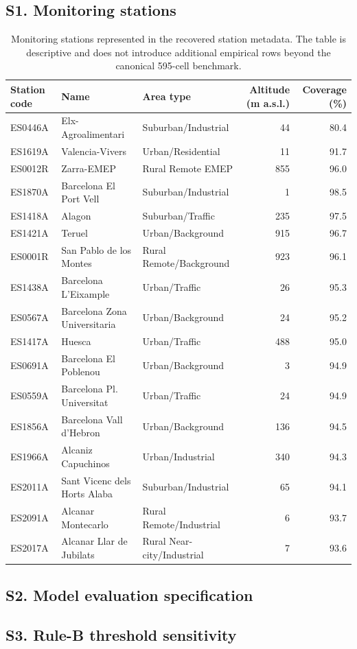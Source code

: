 
\subsection*{S1. Monitoring stations}
\begin{table}[ht]
\centering
\small
\setlength{\tabcolsep}{3pt}
\caption{Monitoring stations represented in the recovered station metadata. The table is descriptive and does not introduce additional empirical rows beyond the canonical 595-cell benchmark.}
\label{tab:stations-supp}
\begin{tabular}{@{}l>{\raggedright\arraybackslash}p{3.8cm}>{\raggedright\arraybackslash}p{3.3cm}rr@{}}
\hline
Station code & Name & Area type & Altitude (m a.s.l.) & Coverage (\%) \\
\hline
ES0446A & Elx-Agroalimentari & Suburban/Industrial & 44 & 80.4 \\
ES1619A & Valencia-Vivers & Urban/Residential & 11 & 91.7 \\
ES0012R & Zarra-EMEP & Rural Remote EMEP & 855 & 96.0 \\
ES1870A & Barcelona El Port Vell & Suburban/Industrial & 1 & 98.5 \\
ES1418A & Alagon & Suburban/Traffic & 235 & 97.5 \\
ES1421A & Teruel & Urban/Background & 915 & 96.7 \\
ES0001R & San Pablo de los Montes & Rural Remote/Background & 923 & 96.1 \\
ES1438A & Barcelona L'Eixample & Urban/Traffic & 26 & 95.3 \\
ES0567A & Barcelona Zona Universitaria & Urban/Background & 24 & 95.2 \\
ES1417A & Huesca & Urban/Traffic & 488 & 95.0 \\
ES0691A & Barcelona El Poblenou & Urban/Background & 3 & 94.9 \\
ES0559A & Barcelona Pl. Universitat & Urban/Traffic & 24 & 94.9 \\
ES1856A & Barcelona Vall d'Hebron & Urban/Background & 136 & 94.5 \\
ES1966A & Alcaniz Capuchinos & Urban/Industrial & 340 & 94.3 \\
ES2011A & Sant Vicenc dels Horts Alaba & Suburban/Industrial & 65 & 94.1 \\
ES2091A & Alcanar Montecarlo & Rural Remote/Industrial & 6 & 93.7 \\
ES2017A & Alcanar Llar de Jubilats & Rural Near-city/Industrial & 7 & 93.6 \\
\hline
\end{tabular}
\end{table}

\subsection*{S2. Model evaluation specification}


\subsection*{S3. Rule-B threshold sensitivity}

